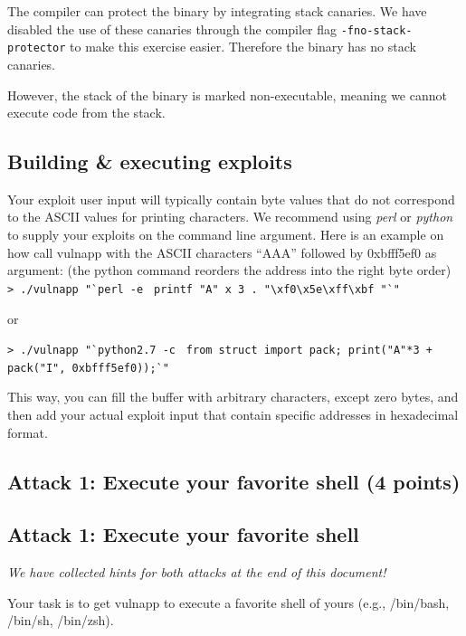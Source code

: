 \documentclass[a4paper,11pt]{article}
\begin{document}
The compiler can protect the binary by integrating stack canaries. We have
disabled the use of these canaries through the compiler flag
\texttt{-fno-stack-protector} to make this exercise easier. Therefore the binary
has no stack canaries.

However, the stack of the binary is marked non-executable, meaning we cannot
execute code from the stack.


\subsection*{Building \& executing exploits}

Your exploit user input will typically contain byte values that do not
correspond to the ASCII values for printing characters. We recommend using {\it
perl} or {\it python} to supply your exploits on the command line argument. Here
is an example on how call vulnapp with the ASCII characters ``AAA'' followed by
0xbfff5ef0 as argument: (the python command reorders the address into the right byte order)\\
\verb|> ./vulnapp "|\`{}\verb|perl -e | \textquotesingle \verb|printf "A" x 3 . "\xf0\x5e\xff\xbf "|\textquotesingle \`{}\verb|"|

or 


{\footnotesize
\noindent\verb|> ./vulnapp "|\`{}\verb|python2.7 -c | \textquotesingle \verb|from struct import pack; print("A"*3 + pack("I", 0xbfff5ef0));|\textquotesingle \`{}\verb|"|  \\
}

This way, you can fill the buffer with arbitrary characters, except zero bytes,
and then add your actual exploit input that contain specific addresses in
hexadecimal format.


\ifsolution 
\subsection*{Attack 1: Execute your favorite shell (4 points)}
\else
\subsection*{Attack 1: Execute your favorite shell}
\fi

\emph{We have collected hints for both attacks at the end of this
  document!}

Your task is to get {\sc vulnapp} to execute a favorite shell of yours (e.g.,
/bin/bash, /bin/sh, /bin/zsh).
\end{document}
